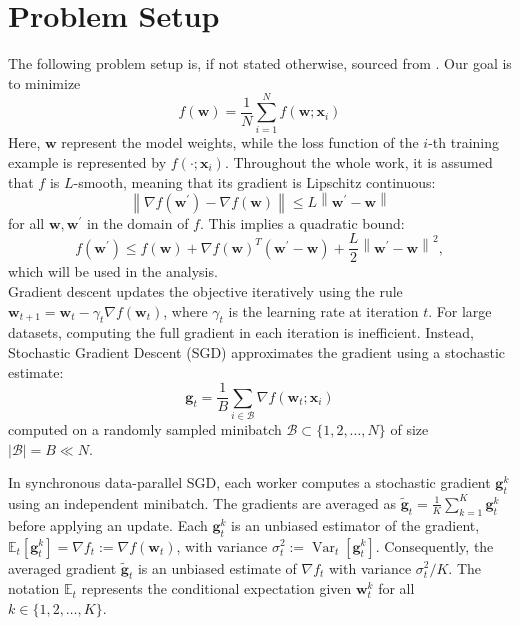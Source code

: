 \documentclass[10pt,twocolumn,letterpaper]{article}
\begin{document}
\section{Problem Setup}
The following problem setup is, if not stated otherwise, sourced from \cite{BALLES2024P}.
Our goal is to minimize
\begin{equation}
f(\mathbf{w})=\frac{1}{N} \sum_{i=1}^N f\left(\mathbf{w} ; \mathbf{x}_i\right)
\end{equation}
Here, \(\mathbf{w}\) represent the model weights, while the loss function of the \(i\)-th training example is represented by \(f\left(\cdot ; \mathbf{x}_i\right)\). Throughout the whole work, it is assumed that \(f\) is \(L\)-smooth, meaning that its gradient is Lipschitz continuous:
\[
\left\|\nabla f\left(\mathbf{w}^{\prime}\right)-\nabla f(\mathbf{w})\right\| \leq L\left\|\mathbf{w}^{\prime}-\mathbf{w}\right\|
\]
for all \(\mathbf{w}, \mathbf{w}^{\prime}\) in the domain of \(f\). This implies a quadratic bound:
\[
f\left(\mathbf{w}^{\prime}\right) \leq f(\mathbf{w})+\nabla f(\mathbf{w})^T\left(\mathbf{w}^{\prime}-\mathbf{w}\right)+\frac{L}{2}\left\|\mathbf{w}^{\prime}-\mathbf{w}\right\|^2,
\]
which will be used in the analysis.\\
Gradient descent updates the objective iteratively using the rule \(\mathbf{w}_{t+1} = \mathbf{w}_t - \gamma_t \nabla f\left(\mathbf{w}_t\right)\), where \(\gamma_t\) is the learning rate at iteration \(t\). For large datasets, computing the full gradient in each iteration is inefficient. Instead, Stochastic Gradient Descent (SGD) approximates the gradient using a stochastic estimate:
\[
\mathbf{g}_t = \frac{1}{B} \sum_{i \in \mathcal{B}} \nabla f\left(\mathbf{w}_t ; \mathbf{x}_i\right)
\]
computed on a randomly sampled minibatch \(\mathcal{B} \subset \{1,2,\dots,N\}\) of size \(|\mathcal{B}| = B \ll N\).

In synchronous data-parallel SGD, each worker computes a stochastic gradient \(\mathbf{g}_t^k\) using an independent minibatch. The gradients are averaged as \(\tilde{\mathbf{g}}_t = \frac{1}{K} \sum_{k=1}^K \mathbf{g}_t^k\) before applying an update. Each \(\mathbf{g}_t^k\) is an unbiased estimator of the gradient, \(\mathbb{E}_t\left[\mathbf{g}_t^k\right] = \nabla f_t := \nabla f\left(\mathbf{w}_t\right)\), with variance \(\sigma_t^2 := \operatorname{Var}_t\left[\mathbf{g}_t^k\right]\). Consequently, the averaged gradient \(\tilde{\mathbf{g}}_t\) is an unbiased estimate of \(\nabla f_t\) with variance \(\sigma_t^2 / K\). The notation \(\mathbb{E}_t\) represents the conditional expectation given \(\mathbf{w}_t^k\) for all \(k \in \{1,2,\dots,K\}\).
\end{document}
